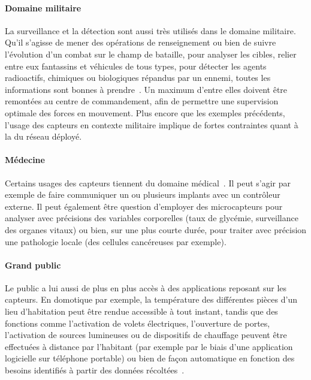         \paragraph{Domaine militaire}
La surveillance et la détection sont aussi très utilisés dans le domaine militaire.
Qu'il s'agisse de mener des opérations de renseignement ou bien de suivre l'évolution d'un combat sur le champ de bataille, pour analyser les cibles, relier entre eux fantassins et véhicules de tous types, pour détecter les agents radioactifs, chimiques ou biologiques répandus par un ennemi, toutes les informations sont bonnes à prendre~\cite{ASSC02}.
Un maximum d'entre elles doivent être remontées au centre de commandement, afin de permettre une supervision optimale des forces en mouvement.
Plus encore que les exemples précédents, l'usage des capteurs en contexte militaire implique de fortes contraintes quant à la \secu du réseau déployé.

        \paragraph{Médecine}
Certains usages des capteurs tiennent du domaine médical~\cite{SZFDXC14}.
Il peut s'agir par exemple de faire communiquer un ou plusieurs implants avec un contrôleur externe.
Il peut également être question d'employer des microcapteurs pour analyser avec précisions des variables corporelles (taux de glycémie, surveillance des organes vitaux) ou bien, sur une plus courte durée, pour traiter avec précision une pathologie locale (des cellules cancéreuses par exemple).

        \paragraph{Grand public}
Le public a lui aussi de plus en plus accès à des applications reposant sur les capteurs.
En domotique par exemple, la température des différentes pièces d'un lieu d'habitation peut être rendue accessible à tout instant, tandis que des fonctions comme l'activation de volets électriques, l'ouverture de portes, l'activation de sources lumineuses ou de dispositifs de chauffage peuvent être effectuées à distance par l'habitant (par exemple par le biais d'une application logicielle sur téléphone portable) ou bien de façon automatique en fonction des besoins identifiés à partir des données récoltées~\cite{ASSC02}.

